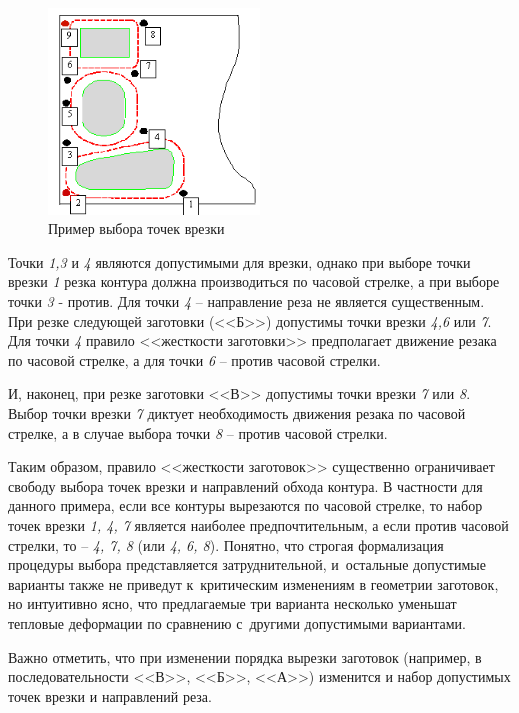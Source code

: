 \documentclass[11pt,twoside,openany]{report}
\begin{document}
\begin{figure}[h]
  \begin{center}
  \includegraphics[width=0.5\textwidth]{part-hardness.png}
  \caption{Пример выбора точек врезки}
  \label{part-hardness}
  \end{center}
\end{figure}

Точки
\textit{1,3} и \textit{4}
являются допустимыми для врезки,
однако при выборе точки врезки {\it 1} резка контура
должна производиться по часовой стрелке,
а при выборе точки {\it 3} - против.
Для точки {\it 4} -- направление реза не является существенным.
При резке следующей заготовки (<<Б>>)
допустимы точки врезки {\it 4,6} или {\it 7}.
Для точки {\it 4} правило <<жесткости заготовки>>
предполагает движение резака по часовой стрелке,
а для точки {\it 6} – против часовой стрелки.

И, наконец, при резке заготовки <<В>>
допустимы точки врезки {\it 7} или {\it 8}.
Выбор точки врезки {\it 7} диктует необходимость
движения резака по часовой стрелке,
а в случае выбора точки {\it 8} – против часовой стрелки.

Таким образом, правило <<жесткости заготовок>>
существенно ограничивает свободу выбора точек
врезки и направлений обхода контура.
В частности для данного примера,
если все контуры вырезаются по часовой стрелке,
то набор точек врезки {\it 1, 4, 7}
является наиболее предпочтительным,
а если против часовой стрелки, то -- {\it 4, 7, 8}
(или {\it 4, 6, 8}).
Понятно, что строгая формализация процедуры
выбора представляется затруднительной,
и~остальные допустимые варианты также не приведут
к~критическим изменениям в геометрии заготовок,
но интуитивно ясно, что предлагаемые три варианта
несколько уменьшат тепловые деформации по сравнению
с~другими допустимыми вариантами.

Важно отметить,
что при изменении порядка вырезки заготовок
(например, в последовательности <<В>>, <<Б>>, <<А>>)
изменится и набор допустимых точек врезки и направлений реза.
\end{document}
